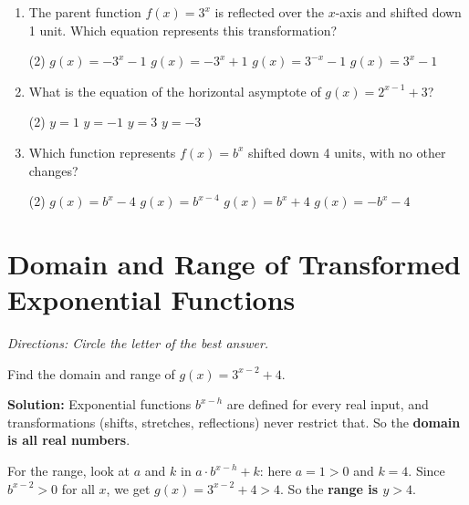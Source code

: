 \documentclass[11pt]{article}
\begin{document}
\begin{enumerate}[leftmargin=1.5em, itemsep=10pt]
\item The parent function $f(x) = 3^x$ is reflected over the $x$-axis and shifted down 1 unit. Which equation represents this transformation?
\begin{tasks}(2)
  \task $g(x) = -3^x - 1$
  \task $g(x) = -3^x + 1$
  \task $g(x) = 3^{-x} - 1$
  \task $g(x) = 3^x - 1$
\end{tasks}

\item What is the equation of the horizontal asymptote of $g(x) = 2^{x-1} + 3$?
\begin{tasks}(2)
  \task $y = 1$
  \task $y = -1$
  \task $y = 3$
  \task $y = -3$
\end{tasks}

\item Which function represents $f(x) = b^x$ shifted down 4 units, with no other changes?
\begin{tasks}(2)
  \task $g(x) = b^x - 4$
  \task $g(x) = b^{x-4}$
  \task $g(x) = b^x + 4$
  \task $g(x) = -b^x - 4$
\end{tasks}

\end{enumerate}

\newpage
\section{Domain and Range of Transformed Exponential Functions}
\textit{Directions: Circle the letter of the best answer.}

\begin{example}
Find the domain and range of $g(x) = 3^{x-2} + 4$.

\textbf{Solution:} Exponential functions $b^{x-h}$ are defined for every real input, and transformations (shifts, stretches, reflections) never restrict that. So the \textbf{domain is all real numbers}.

For the range, look at $a$ and $k$ in $a\cdot b^{x-h}+k$: here $a = 1 > 0$ and $k = 4$. Since $b^{x-2} > 0$ for all $x$, we get $g(x) = 3^{x-2} + 4 > 4$. So the \textbf{range is $y > 4$}.
\end{example}
\end{document}
